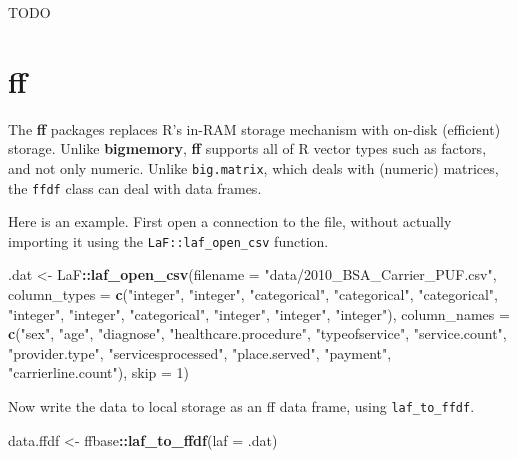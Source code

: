 \documentclass[]{book}
\newenvironment{Shaded}{\begin{snugshade}}{\end{snugshade}}
\newcommand{\DataTypeTok}[1]{\textcolor[rgb]{0.13,0.29,0.53}{#1}}
\newcommand{\DecValTok}[1]{\textcolor[rgb]{0.00,0.00,0.81}{#1}}
\newcommand{\KeywordTok}[1]{\textcolor[rgb]{0.13,0.29,0.53}{\textbf{#1}}}
\newcommand{\NormalTok}[1]{#1}
\newcommand{\OperatorTok}[1]{\textcolor[rgb]{0.81,0.36,0.00}{\textbf{#1}}}
\newcommand{\StringTok}[1]{\textcolor[rgb]{0.31,0.60,0.02}{#1}}
\theoremstyle{definition}
\theoremstyle{definition}
\theoremstyle{definition}
\theoremstyle{remark}
\begin{document}
TODO

\hypertarget{ff}{%
\section{ff}\label{ff}}

The \textbf{ff} packages replaces R's in-RAM storage mechanism with on-disk (efficient) storage.
Unlike \textbf{bigmemory}, \textbf{ff} supports all of R vector types such as factors, and not only numeric.
Unlike \texttt{big.matrix}, which deals with (numeric) matrices, the \texttt{ffdf} class can deal with data frames.

Here is an example.
First open a connection to the file, without actually importing it using the \texttt{LaF::laf\_open\_csv} function.

\begin{Shaded}
\begin{Highlighting}[]
\NormalTok{.dat <-}\StringTok{ }\NormalTok{LaF}\OperatorTok{::}\KeywordTok{laf_open_csv}\NormalTok{(}\DataTypeTok{filename =} \StringTok{"data/2010_BSA_Carrier_PUF.csv"}\NormalTok{,}
                    \DataTypeTok{column_types =} \KeywordTok{c}\NormalTok{(}\StringTok{"integer"}\NormalTok{, }\StringTok{"integer"}\NormalTok{, }\StringTok{"categorical"}\NormalTok{, }\StringTok{"categorical"}\NormalTok{, }\StringTok{"categorical"}\NormalTok{, }\StringTok{"integer"}\NormalTok{, }\StringTok{"integer"}\NormalTok{, }\StringTok{"categorical"}\NormalTok{, }\StringTok{"integer"}\NormalTok{, }\StringTok{"integer"}\NormalTok{, }\StringTok{"integer"}\NormalTok{), }
                    \DataTypeTok{column_names =} \KeywordTok{c}\NormalTok{(}\StringTok{"sex"}\NormalTok{, }\StringTok{"age"}\NormalTok{, }\StringTok{"diagnose"}\NormalTok{, }\StringTok{"healthcare.procedure"}\NormalTok{, }\StringTok{"typeofservice"}\NormalTok{, }\StringTok{"service.count"}\NormalTok{, }\StringTok{"provider.type"}\NormalTok{, }\StringTok{"servicesprocessed"}\NormalTok{, }\StringTok{"place.served"}\NormalTok{, }\StringTok{"payment"}\NormalTok{, }\StringTok{"carrierline.count"}\NormalTok{), }
                    \DataTypeTok{skip =} \DecValTok{1}\NormalTok{)}
\end{Highlighting}
\end{Shaded}

Now write the data to local storage as an ff data frame, using \texttt{laf\_to\_ffdf}.

\begin{Shaded}
\begin{Highlighting}[]
\NormalTok{data.ffdf <-}\StringTok{ }\NormalTok{ffbase}\OperatorTok{::}\KeywordTok{laf_to_ffdf}\NormalTok{(}\DataTypeTok{laf =}\NormalTok{ .dat)}
\end{Highlighting}
\end{Shaded}
\end{document}
